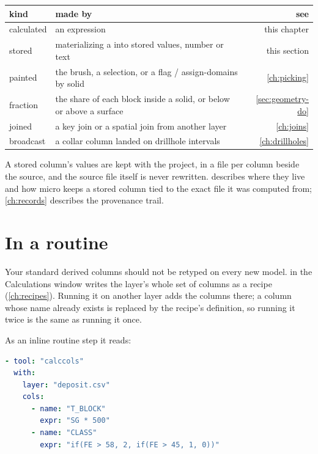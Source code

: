 \begin{center}
\begin{tabularx}{\linewidth}{@{}lMD@{}}\toprule
kind & made by & see \\ \midrule
{} calculated & an expression & this chapter \\
 stored & materializing a  into stored values, number or text & this section \\
 painted & the brush, a selection, or a flag / assign-domains by solid & \cref{ch:picking} \\
\code{\%} fraction & the share of each block inside a solid, or below or above a surface & \cref{sec:geometry-do} \\
 joined & a key join or a spatial join from another layer & \cref{ch:joins} \\
 broadcast & a collar column landed on drillhole intervals & \cref{ch:drillholes} \\ \bottomrule
\end{tabularx}
\end{center}

\begin{note}
A stored column's values are kept with the project, in a file per column beside the source, and the source file itself is never rewritten.  describes where they live and how micro keeps a stored column tied to the exact file it was computed from; \cref{ch:records} describes the provenance trail.
\end{note}

\section{In a routine}\label{sec:filter-routine}
Your standard derived columns should not be retyped on every new model.  in the Calculations window writes the layer's whole set of  columns as a recipe (\cref{ch:recipes}). Running it on another layer adds the columns there; a column whose name already exists is replaced by the recipe's definition, so running it twice is the same as running it once.

As an inline routine step it reads:

\begin{lstlisting}[language=yaml]
- tool: "calccols"
  with:
    layer: "deposit.csv"
    cols:
      - name: "T_BLOCK"
        expr: "SG * 500"
      - name: "CLASS"
        expr: "if(FE > 58, 2, if(FE > 45, 1, 0))"
\end{lstlisting}

